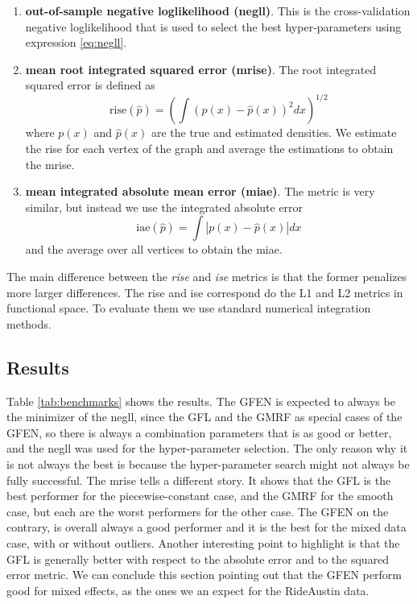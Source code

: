 \documentclass[a4paper, 11pt]{article}
\begin{document}
\begin{enumerate}[itemsep=0pt, partopsep=0pt]
    \item \textbf{out-of-sample negative loglikelihood (negll)}. This is the cross-validation negative loglikelihood that is used to select the best hyper-parameters using expression \eqref{eq:negll}. 
    \item \textbf{mean root integrated squared error (mrise)}. The root integrated squared error is defined as $$\mathrm{rise}(\hat{p}) = \left(\int (p(x) - \hat{p}(x))^2 dx\right)^{1/2}$$ where $p(x)$ and $\hat{p}(x)$ are the true and estimated densities. We estimate the rise for each vertex of the graph and average the estimations to obtain the mrise.
    \item \textbf{mean integrated absolute mean error (miae)}. The metric is very similar, but instead we use the integrated absolute error
    $$
    \mathrm{iae}(\hat{p}) = \int \left| p(x) - \hat{p}(x)\right| dx
    $$
    and the average over all vertices to obtain the miae.
\end{enumerate}
The main difference between the \textit{rise} and \textit{ise} metrics is that the former penalizes more larger differences. The rise and ise correspond do the L1 and L2 metrics in functional space. To evaluate them we use standard numerical integration methods.

\subsection{Results}

Table \ref{tab:benchmarks} shows the results. The GFEN is expected to always be the minimizer of the negll, since the GFL and the GMRF as special cases of the GFEN, so there is always a combination parameters that is as good or better, and the negll was used for the hyper-parameter selection. The only reason why it is not always the best is because the hyper-parameter search might not always be fully successful. The mrise tells a different story. It shows that the GFL is the best performer for the piecewise-constant case, and the GMRF for the smooth case, but each are the worst performers for the other case. The GFEN on the contrary, is overall always a good performer and it is the best for the mixed data case, with or without outliers. Another interesting point to highlight is that the GFL is generally better with respect to the absolute error and to the squared error metric. We can conclude this section pointing out that the GFEN perform good for mixed effects, as the ones we an expect for the RideAustin data.
\end{document}

